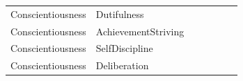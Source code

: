 \documentclass{article}\usepackage[]{graphicx}\usepackage[]{color}
\begin{document}
\begin{table}
\begin{tabular}[t]{lllllll}
Conscientiousness & Dutifulness & \cellcolor{white}{0.2} & \cellcolor{white}{0.1} & \cellcolor{yellow}{0.76} & \cellcolor{white}{0.16} & \cellcolor{white}{-0.02}\\
Conscientiousness & AchievementStriving & \cellcolor{white}{0.24} & \cellcolor{white}{0.11} & \cellcolor{yellow}{0.81} & \cellcolor{white}{-0.05} & \cellcolor{white}{0.03}\\
Conscientiousness & SelfDiscipline & \cellcolor{white}{0.12} & \cellcolor{white}{-0.08} & \cellcolor{yellow}{0.84} & \cellcolor{white}{0.13} & \cellcolor{white}{0.01}\\
Conscientiousness & Deliberation & \cellcolor{white}{-0.08} & \cellcolor{white}{0.05} & \cellcolor{yellow}{0.68} & \cellcolor{white}{0.28} & \cellcolor{white}{0.07}\\
\bottomrule
\end{tabular}
\end{table}
\end{document}

